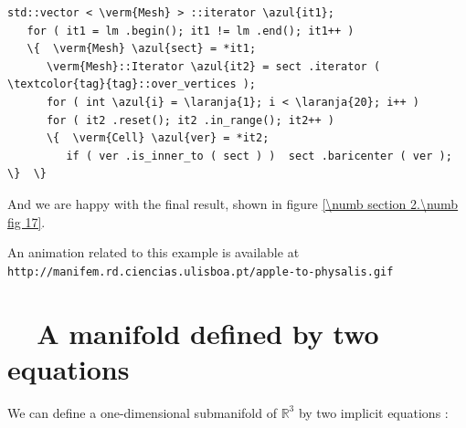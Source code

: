 \begin{Verbatim}[commandchars=\\\{\},formatcom=\small\tt,frame=single,
   label=parag-\ref{\numb section 2.\numb parag 14}.cpp,rulecolor=\color{moldura},
   baselinestretch=0.94,framesep=2mm]
   std::vector < \verm{Mesh} > ::iterator \azul{it1};
   for ( it1 = lm .begin(); it1 != lm .end(); it1++ )
   \{  \verm{Mesh} \azul{sect} = *it1;
      \verm{Mesh}::Iterator \azul{it2} = sect .iterator ( \textcolor{tag}{tag}::over_vertices );
      for ( int \azul{i} = \laranja{1}; i < \laranja{20}; i++ )
      for ( it2 .reset(); it2 .in_range(); it2++ )
      \{  \verm{Cell} \azul{ver} = *it2;
         if ( ver .is_inner_to ( sect ) )  sect .baricenter ( ver );  \}  \}
\end{Verbatim}

And we are happy with the final result, shown in figure \ref{\numb section 2.\numb fig 17}.

An animation related to this example is available at\hfil\break
{\small\tt http://manifem.rd.ciencias.ulisboa.pt/apple-to-physalis.gif}


\section{~~A manifold defined by two equations}\label{\numb section 2.\numb parag 15}

We can define a one-dimensional submanifold of $ \mathbb{R}^3 $ by two implicit equations :
\medskip

